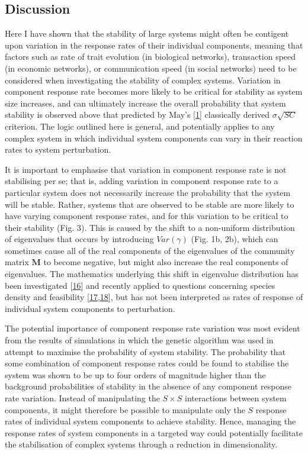 \documentclass[]{article}
\begin{document}
\subsection{Discussion}\label{discussion}

Here I have shown that the stability of large systems might often be
contigent upon variation in the response rates of their individual
components, meaning that factors such as rate of trait evolution (in
biological networks), transaction speed (in economic networks), or
communication speed (in social networks) need to be considered when
investigating the stability of complex systems. Variation in component
response rate becomes more likely to be critical for stability as system
size increases, and can ultimately increase the overall probability that
system stability is observed above that predicted by May's
{[}\protect\hyperlink{ref-May1972}{1}{]} classically derived
\(\sigma \sqrt{SC}\) criterion. The logic outlined here is general, and
potentially applies to any complex system in which individual system
components can vary in their reaction rates to system perturbation.

It is important to emphasise that variation in component response rate
is not stabilising per se; that is, adding variation in component
response rate to a particular system does not necessarily increase the
probability that the system will be stable. Rather, systems that are
observed to be stable are more likely to have varying component response
rates, and for this variation to be critical to their stability (Fig.
3). This is caused by the shift to a non-uniform distribution of
eigenvalues that occurs by introducing \(Var(\gamma)\) (Fig. 1b, 2b),
which can sometimes cause all of the real components of the eigenvalues
of the community matrix \(\mathbf{M}\) to become negative, but might
also increase the real components of eigenvalues. The mathematics
underlying this shift in eigenvalue distribution has been investigated
{[}\protect\hyperlink{ref-Ahmadian2015}{16}{]} and recently applied to
questions concerning species density and feasibility
{[}\protect\hyperlink{ref-Gibbs2017}{17},\protect\hyperlink{ref-Stone2017}{18}{]},
but has not been interpreted as rates of response of individual system
components to perturbation.

The potential importance of component response rate variation was most
evident from the results of simulations in which the genetic algorithm
was used in attempt to maximise the probability of system stability. The
probability that some combination of component response rates could be
found to stabilise the system was shown to be up to four orders of
magnitude higher than the background probabilities of stability in the
absence of any component response rate variation. Instead of
manipulating the \(S \times S\) interactions between system components,
it might therefore be possible to manipulate only the \(S\) response
rates of individual system components to achieve stability. Hence,
managing the response rates of system components in a targeted way could
potentially facilitate the stabilisation of complex systems through a
reduction in dimensionality.
\end{document}
